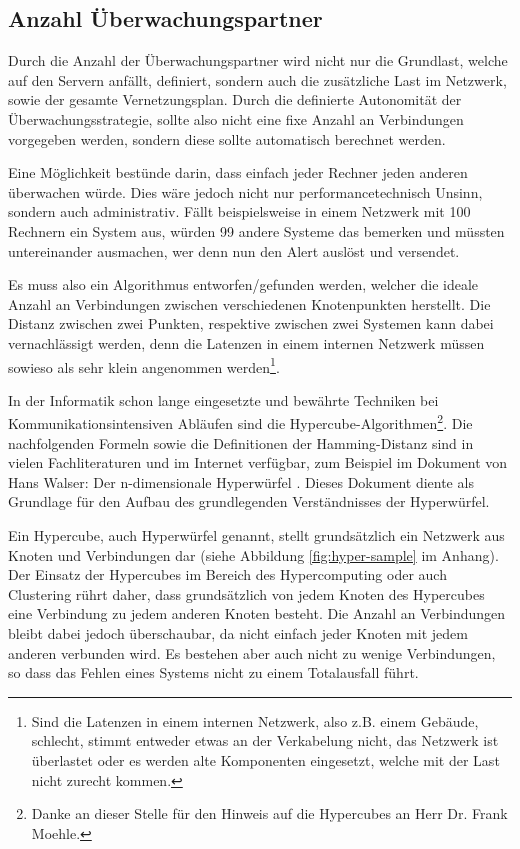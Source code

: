 \subsection{Anzahl \"Uberwachungspartner} \label{sec:theorie-fragmentierung-numhosts}
Durch die Anzahl der \"Uberwachungspartner wird nicht nur die Grundlast, welche auf den Servern anf\"allt, definiert, sondern auch die zus\"atzliche Last im Netzwerk, sowie der gesamte Vernetzungsplan. Durch die definierte Autonomit\"at der \"Uberwachungsstrategie, sollte also nicht eine fixe Anzahl an Verbindungen vorgegeben werden, sondern diese sollte automatisch berechnet werden.

Eine M\"oglichkeit best\"unde darin, dass einfach jeder Rechner jeden anderen \"uberwachen w\"urde. Dies w\"are jedoch nicht nur performancetechnisch Unsinn, sondern auch administrativ. F\"allt beispielsweise in einem Netzwerk mit 100 Rechnern ein System aus, w\"urden 99 andere Systeme das bemerken und m\"ussten untereinander ausmachen, wer denn nun den Alert ausl\"ost und versendet.

Es muss also ein Algorithmus entworfen/gefunden werden, welcher die ideale Anzahl an Verbindungen zwischen verschiedenen Knotenpunkten herstellt. Die Distanz zwischen zwei Punkten, respektive zwischen zwei Systemen kann dabei vernachl\"assigt werden, denn die Latenzen in einem internen Netzwerk m\"ussen sowieso als sehr klein angenommen werden\footnote{\label{foot:theorie-frag-latenzen}Sind die Latenzen in einem internen Netzwerk, also z.B. einem Geb\"aude, schlecht, stimmt entweder etwas an der Verkabelung nicht, das Netzwerk ist \"uberlastet oder es werden alte Komponenten eingesetzt, welche mit der Last nicht zurecht kommen.}.

In der Informatik schon lange eingesetzte und bew\"ahrte Techniken bei Kommunikationsintensiven Abl\"aufen sind die Hypercube-Algorithmen\footnote{Danke an dieser Stelle f\"ur den Hinweis auf die Hypercubes an Herr Dr. Frank Moehle.}. Die nachfolgenden Formeln sowie die Definitionen der Hamming-Distanz sind in vielen Fachliteraturen und im Internet verf\"ugbar, zum Beispiel im Dokument von Hans Walser: Der n-dimensionale Hyperw\"urfel \cite{hypercube}. Dieses Dokument diente als Grundlage f\"ur den Aufbau des grundlegenden Verst\"andnisses der Hyperw\"urfel.

Ein Hypercube, auch Hyperw\"urfel genannt, stellt grunds\"atzlich ein Netzwerk aus Knoten und Verbindungen dar (siehe Abbildung \ref{fig:hyper-sample} im Anhang). Der Einsatz der Hypercubes im Bereich des Hypercomputing oder auch Clustering r\"uhrt daher, dass grunds\"atzlich von jedem Knoten des Hypercubes eine Verbindung zu jedem anderen Knoten besteht. Die Anzahl an Verbindungen bleibt dabei jedoch \"uberschaubar, da nicht einfach jeder Knoten mit jedem anderen verbunden wird. Es bestehen aber auch nicht zu wenige Verbindungen, so dass das Fehlen eines Systems nicht zu einem Totalausfall f\"uhrt.

